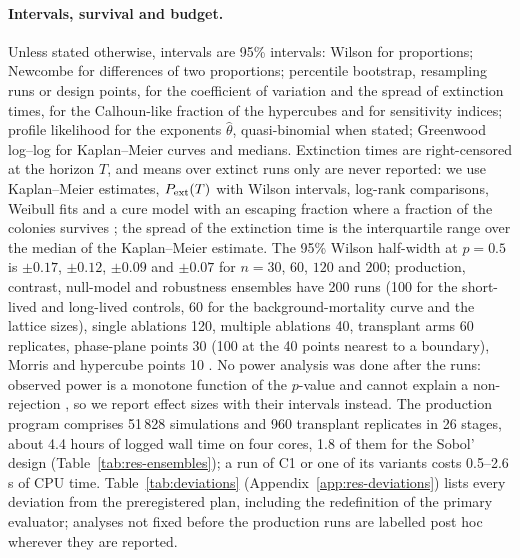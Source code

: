 \paragraph{Intervals, survival and budget.}
Unless stated otherwise, intervals are 95\% intervals: Wilson for proportions; Newcombe for differences of two
proportions; percentile bootstrap, resampling runs or design points, for the coefficient of variation and the
spread of extinction times, for the Calhoun-like fraction of the hypercubes and for sensitivity indices; profile
likelihood for the exponents $\hat\theta$, quasi-binomial when stated; Greenwood log--log for Kaplan--Meier curves
and medians. Extinction times are right-censored at the horizon $T$, and means over extinct runs only are never
reported: we use Kaplan--Meier estimates, $P_{\rm ext}(T)$ with Wilson intervals, log-rank comparisons, Weibull fits
and a cure model with an escaping fraction where a fraction of the colonies survives \cite{Ovaskainen2010}; the
spread of the extinction time is the interquartile range over the median of the Kaplan--Meier estimate.
The 95\% Wilson half-width at $p=0.5$ is $\pm0.17$, $\pm0.12$, $\pm0.09$ and $\pm0.07$ for $n=30$, $60$, $120$ and
$200$; production, contrast, null-model and robustness ensembles have 200 runs (100 for the short-lived and long-lived
controls, 60 for the background-mortality curve and the lattice sizes), single ablations 120, multiple ablations 40,
transplant arms 60 replicates, phase-plane points 30 (100 at the 40 points nearest to a boundary), Morris and
hypercube points 10 \cite{Lorscheid2012}. No power analysis was done after the runs: observed
power is a monotone function of the $p$-value and cannot explain a non-rejection \cite{HoenigHeisey2001}, so we
report effect sizes with their intervals instead. The production program comprises 51\,828 simulations and 960
transplant replicates in 26 stages, about 4.4 hours of logged wall time on four cores, 1.8 of them for the Sobol'
design (Table~\ref{tab:res-ensembles}); a run of \textsf{C1} or one of its variants costs 0.5--2.6\,s of CPU time.
Table~\ref{tab:deviations} (Appendix~\ref{app:res-deviations}) lists every deviation from the
preregistered plan, including the redefinition of the primary evaluator; analyses not fixed before the production runs are labelled
post hoc wherever they are reported.
